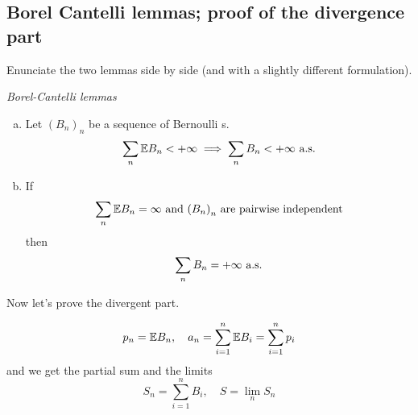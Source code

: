 \documentclass{report}
\begin{document}
\subsection{Borel Cantelli lemmas; proof of the divergence part}
Enunciate the two lemmas side by side (and with a slightly different formulation).
\begin{theorem}
	\emph{Borel-Cantelli lemmas}\\
	\begin{enumerate}[a)]
		\item Let ${(B_n)}_{n}$ be a sequence of Bernoulli \rv s.
		\[\sum_n \mathbb{E} B_n<+\infty\implies\sum_n B_n<+\infty\text{ a.s.}\]
		\item If 
		\[\sum_n\mathbb{E} B_n=\infty\text{ and }{(B_n)}_{n}\text{ are pairwise independent}\]
		then
		\[\sum_n B_n=+\infty\text{ a.s.}\]
	\end{enumerate}
\end{theorem}
Now let's prove the divergent part.
	\begin{notation}
	\[p_n=\mathbb{E} B_n,\quad a_n=\sum_{i=1}^n\mathbb{E} B_i=\sum_{i=1}^{n}p_i\]
	and we get the partial sum and the limits
	\[S_n=\sum_{i=1}^{n}B_i,\quad S=\lim_n S_n\]
\end{notation}
\end{document}
